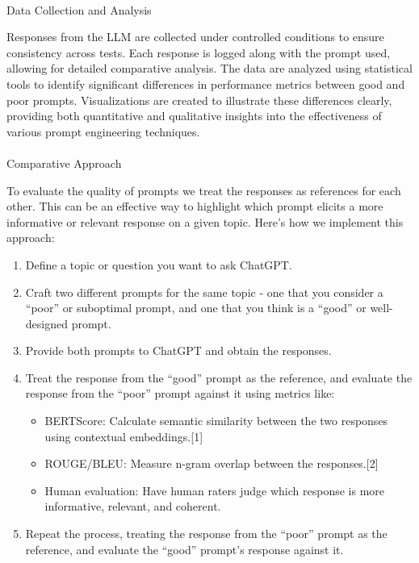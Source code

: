 \documentclass[
]{agujournal2019}
\makeatletter
\let\oldparagraph\paragraph
\renewcommand{\paragraph}{
    \@ifstar
      \xxxParagraphStar
      \xxxParagraphNoStar
  }
\newcommand{\xxxParagraphStar}[1]{\oldparagraph*{#1}\mbox{}}
\newcommand{\xxxParagraphNoStar}[1]{\oldparagraph{#1}\mbox{}}
\providecommand{\tightlist}{%
  \setlength{\itemsep}{0pt}\setlength{\parskip}{0pt}}\usepackage{longtable,booktabs,array}
\makeatother
\begin{document}
\paragraph{Data Collection and
Analysis}\label{data-collection-and-analysis}

Responses from the LLM are collected under controlled conditions to
ensure consistency across tests. Each response is logged along with the
prompt used, allowing for detailed comparative analysis. The data are
analyzed using statistical tools to identify significant differences in
performance metrics between good and poor prompts. Visualizations are
created to illustrate these differences clearly, providing both
quantitative and qualitative insights into the effectiveness of various
prompt engineering techniques.

\paragraph{Comparative Approach}\label{comparative-approach}

To evaluate the quality of prompts we treat the responses as references
for each other. This can be an effective way to highlight which prompt
elicits a more informative or relevant response on a given topic. Here's
how we implement this approach:

\begin{enumerate}
\def\labelenumi{\arabic{enumi}.}
\tightlist
\item
  Define a topic or question you want to ask ChatGPT.
\item
  Craft two different prompts for the same topic - one that you consider
  a ``poor'' or suboptimal prompt, and one that you think is a ``good''
  or well-designed prompt.
\item
  Provide both prompts to ChatGPT and obtain the responses.
\item
  Treat the response from the ``good'' prompt as the reference, and
  evaluate the response from the ``poor'' prompt against it using
  metrics like:

  \begin{itemize}
  \tightlist
  \item
    BERTScore: Calculate semantic similarity between the two responses
    using contextual embeddings.{[}1{]}
  \item
    ROUGE/BLEU: Measure n-gram overlap between the responses.{[}2{]}
  \item
    Human evaluation: Have human raters judge which response is more
    informative, relevant, and coherent.
  \end{itemize}
\item
  Repeat the process, treating the response from the ``poor'' prompt as
  the reference, and evaluate the ``good'' prompt's response against it.
\end{enumerate}
\end{document}
